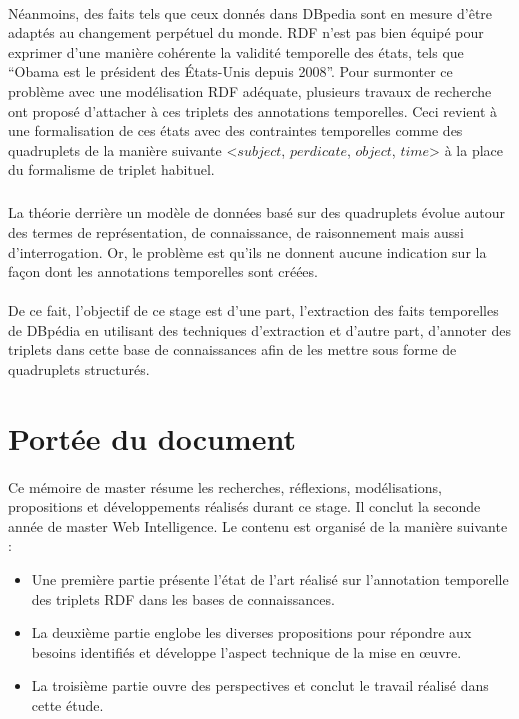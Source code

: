 \paragraph{}
Néanmoins, des faits tels que ceux donnés dans DBpedia sont en mesure d’être adaptés au changement perpétuel du monde.
RDF n’est pas bien équipé pour exprimer d’une manière cohérente la validité temporelle des états, tels que “Obama est le président des États-Unis depuis 2008”. Pour surmonter ce problème avec une modélisation RDF adéquate, plusieurs travaux de recherche ont proposé d’attacher à ces triplets des annotations temporelles. Ceci revient à une formalisation de ces états avec des contraintes temporelles comme des quadruplets de la manière suivante <$subject$, $perdicate$, $object$, $time$> à la place du formalisme de triplet habituel.
\subparagraph{}
La théorie derrière un modèle de données basé sur des quadruplets évolue autour des termes de représentation, de connaissance, de raisonnement mais aussi d’interrogation. Or, le problème est qu’ils ne donnent aucune indication sur la façon dont les annotations temporelles sont créées.
\paragraph{}
De ce fait, l’objectif de ce stage est d’une part, l’extraction des faits temporelles de DBpédia en utilisant des techniques d'extraction et d’autre part, d’annoter des triplets dans cette base de connaissances afin de les mettre sous forme de quadruplets structurés.
\section*{Portée du document}
\paragraph{}
Ce mémoire de master résume les recherches, réflexions, modélisations, propositions et développements réalisés durant ce stage. Il conclut la seconde année de master Web Intelligence. Le contenu est organisé de la manière suivante :
\begin{itemize}
\item Une première partie présente l’état de l’art réalisé sur l’annotation temporelle des triplets RDF dans les bases de connaissances.
\item La deuxième partie englobe les diverses propositions pour répondre aux besoins identifiés et développe l’aspect technique de la mise en \oe{}uvre.
\item La troisième partie ouvre des perspectives et conclut le travail réalisé dans cette étude.
\end{itemize}